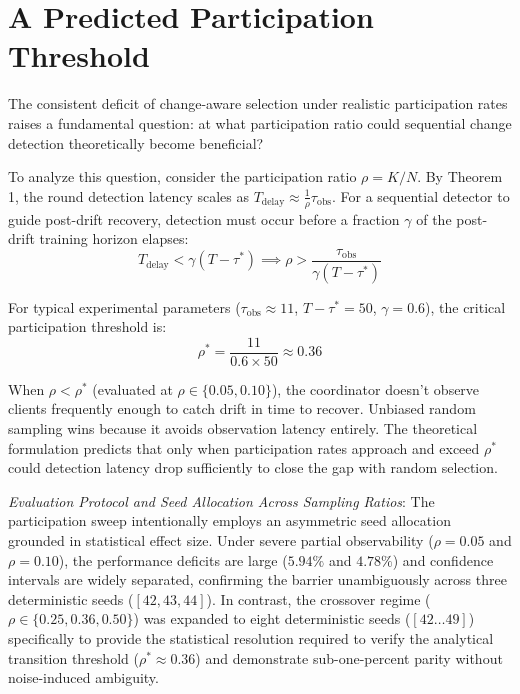 \documentclass[conference]{IEEEtran}
\begin{document}
\section{A Predicted Participation Threshold}
The consistent deficit of change-aware selection under realistic participation rates raises a fundamental question: at what participation ratio could sequential change detection theoretically become beneficial?

To analyze this question, consider the participation ratio $\rho = K/N$. By Theorem 1, the round detection latency scales as $T_{\text{delay}} \approx \frac{1}{\rho} \tau_{\text{obs}}$. For a sequential detector to guide post-drift recovery, detection must occur before a fraction $\gamma$ of the post-drift training horizon elapses:
\begin{equation}
T_{\text{delay}} < \gamma (T - \tau^*) \implies \rho > \frac{\tau_{\text{obs}}}{\gamma (T - \tau^*)}
\end{equation}

For typical experimental parameters ($\tau_{\text{obs}} \approx 11$, $T - \tau^* = 50$, $\gamma = 0.6$), the critical participation threshold is:
\begin{equation}
\rho^* = \frac{11}{0.6 \times 50} \approx 0.36
\end{equation}

When $\rho < \rho^*$ (evaluated at $\rho \in \{0.05, 0.10\}$), the coordinator doesn't observe clients frequently enough to catch drift in time to recover. Unbiased random sampling wins because it avoids observation latency entirely. The theoretical formulation predicts that only when participation rates approach and exceed $\rho^*$ could detection latency drop sufficiently to close the gap with random selection.

\textit{Evaluation Protocol and Seed Allocation Across Sampling Ratios}: The participation sweep intentionally employs an asymmetric seed allocation grounded in statistical effect size. Under severe partial observability ($\rho = 0.05$ and $\rho = 0.10$), the performance deficits are large ($5.94\%$ and $4.78\%$) and confidence intervals are widely separated, confirming the barrier unambiguously across three deterministic seeds ($[42, 43, 44]$). In contrast, the crossover regime ($\rho \in \{0.25, 0.36, 0.50\}$) was expanded to eight deterministic seeds ($[42 \dots 49]$) specifically to provide the statistical resolution required to verify the analytical transition threshold ($\rho^* \approx 0.36$) and demonstrate sub-one-percent parity without noise-induced ambiguity.
\end{document}
